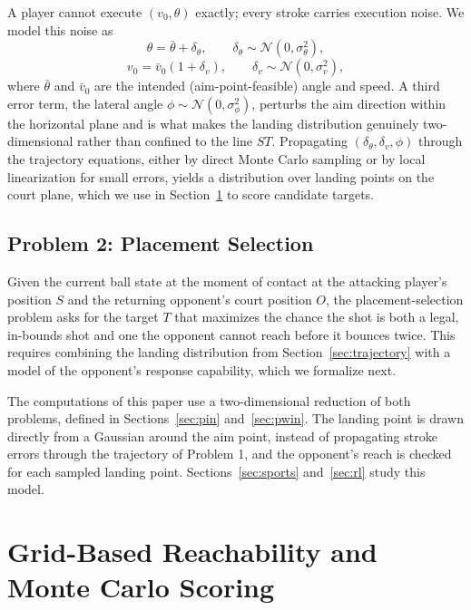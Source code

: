   A player cannot execute $(v_0, \theta)$ exactly; every stroke carries
  execution noise. We model this noise as
  \begin{equation}
  \theta = \bar\theta + \delta_\theta, \qquad
  \delta_\theta \sim \mathcal{N}(0, \sigma_\theta^2),
  \end{equation}
  \begin{equation}
  v_0 = \bar v_0 (1 + \delta_v), \qquad
  \delta_v \sim \mathcal{N}(0, \sigma_v^2),
  \end{equation}
  where $\bar\theta$ and $\bar v_0$ are the intended (aim-point-feasible) angle
  and speed. A third error term, the lateral angle $\phi \sim \mathcal{N}(0,
  \sigma_\phi^2)$, perturbs the aim direction within the horizontal plane and
  is what makes the landing distribution genuinely two-dimensional rather than
  confined to the line $ST$. Propagating $(\delta_\theta, \delta_v, \phi)$
  through the trajectory equations, either by direct Monte Carlo sampling or by
  local linearization for small errors, yields a distribution over landing
  points on the court plane, which we use in Section~\ref{sec:grid} to score
  candidate targets.

  \subsection{Problem 2: Placement Selection}\label{sec:placement}

  Given the current ball state at the moment of contact at the attacking
  player's position $S$ and the returning opponent's court position $O$, the
  placement-selection problem asks for the target $T$ that maximizes the chance
  the shot is both a legal, in-bounds shot and one the opponent cannot reach
  before it bounces twice. This requires combining the landing distribution
  from Section~\ref{sec:trajectory} with a model of the opponent's response
  capability, which we formalize next.

  The computations of this paper use a two-dimensional reduction of both
  problems, defined in Sections~\ref{sec:pin} and~\ref{sec:pwin}. The landing
  point is drawn directly from a Gaussian around the aim point, instead of
  propagating stroke errors through the trajectory of Problem 1, and the
  opponent's reach is checked for each sampled landing point.
  Sections~\ref{sec:sports} and~\ref{sec:rl} study this model.

  \section{Grid-Based Reachability and Monte Carlo Scoring}\label{sec:grid}

